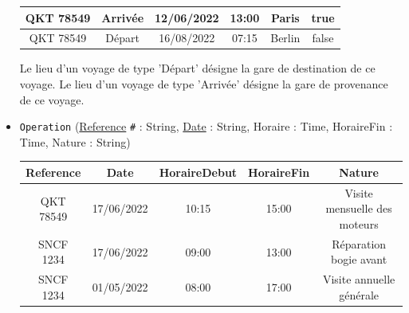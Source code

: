 \documentclass[11pt,a4paper,french,twoside]{PMCours}
\begin{document}
\begin{itemize}
\begin{center}
\begin{tabular}{|c|c|c|c|c|c|}
QKT 78549 & Arrivée & 12/06/2022 & 13:00 & Paris & true\\\hline
QKT 78549 & Départ & 16/08/2022 & 07:15 & Berlin & false\\\hline
\end{tabular}
\end{center}
Le lieu d'un voyage de type 'Départ' désigne la gare de destination de ce voyage. Le lieu d'un voyage de type 'Arrivée' désigne la gare de provenance de ce voyage. 
\item \verb'Operation' (\underline{Reference} \verb'#' : String, \underline{Date} : String, Horaire : Time, HoraireFin : Time, Nature : String)
\begin{center}
\begin{tabular}{|c|c|c|c|c|}\hline
Reference & Date & HoraireDebut & HoraireFin & Nature\\\hline
QKT 78549 & 17/06/2022 & 10:15 & 15:00 & Visite mensuelle des moteurs\\\hline
SNCF 1234 & 17/06/2022 & 09:00 & 13:00 & Réparation bogie avant\\\hline
SNCF 1234 & 01/05/2022 & 08:00 & 17:00 & Visite annuelle générale\\\hline
\end{tabular}
\end{center}
\end{itemize}
\end{document}

